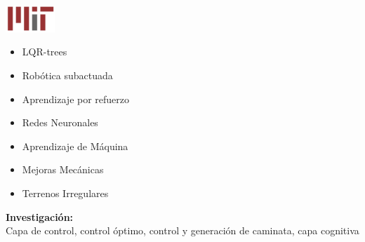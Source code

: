 {\begin{frame}
\begin{columns}[T]
\begin{column}{5.0cm}
{\begin{center}
            \includegraphics[height=1.0cm]{../images/MITLogo.png}            
            \begin{itemize}
            \item LQR-trees
            \item Rob\'otica subactuada
            \item Aprendizaje por refuerzo
            \item Redes Neuronales
            \item Aprendizaje de M\'aquina
            \item Mejoras Mec\'anicas
            \item Terrenos Irregulares
            \end{itemize}
            \textbf{Investigaci\'on:}\\
            Capa de control, control \'optimo, control y generaci\'on de caminata, capa cognitiva
          \end{center}
        }
\end{column}
\end{columns}
\end{frame}}
